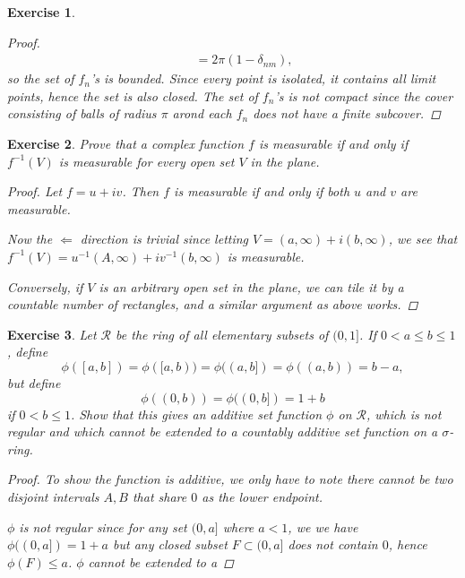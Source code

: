 \documentclass[10pt,letterpaper]{amsart}
\newtheorem{exercise}{Exercise}[section]
\theoremstyle{definition}
\theoremstyle{remark}
\numberwithin{equation}{exercise}
\begin{document}
\begin{multicols}{2}
\begin{exercise}
\begin{proof}
\begin{align*}
        &\quad= 2\pi (1-\delta_{nm}),
      \end{align*}
      so the set of $f_n$'s is bounded. Since every point is isolated, it
      contains all limit points, hence the set is also closed.
      The set of $f_n$'s is not compact since the cover consisting of balls
      of radius $\pi$ arond each $f_n$ does not have a finite subcover.
    \end{proof}
  \end{exercise}
  \begin{exercise}
    Prove that a complex function $f$ is measurable if and only if $f^{-1}(V)$ is
    measurable for every open set $V$ in the plane.
    \begin{proof}
      Let $f = u + iv$. Then $f$ is measurable if and only if both $u$ and $v$
      are measurable.
      \par Now the $\Leftarrow$ direction is trivial since letting $V =
      (a,\infty) + i(b,\infty)$, we see that $f^{-1}(V) = u^{-1}(A,\infty)
      + iv^{-1}(b,\infty)$ is measurable.
      \par Conversely, if $V$ is an arbitrary open set in the plane, we can tile
      it by a countable number of rectangles, and a similar argument as above
      works.
    \end{proof}
  \end{exercise}
  \begin{exercise}
    Let $\mathscr{R}$ be the ring of all elementary subsets of $(0,1]$. If $0 <
    a \le b \le 1$, define
    \begin{equation*}
      \phi([a,b]) = \phi([a,b)) = \phi((a,b]) = \phi((a,b)) = b-a,
    \end{equation*}
    but define
    \begin{equation*}
      \phi((0,b)) = \phi((0,b]) = 1 + b
    \end{equation*}
    if $0 < b \le 1$. Show that this gives an additive set function $\phi$ on
    $\mathscr{R}$, which is not regular and which cannot be extended to a
    countably additive set function on a $\sigma$-ring.
    \begin{proof}
      To show the function is additive, we only have to note there cannot be two
      disjoint intervals $A,B$ that share $0$ as the lower endpoint.
      \par $\phi$ is not regular since for any set $(0,a]$ where $a < 1$, we
      we have $\phi((0,a]) = 1+a$ but any closed subset $F \subset (0,a]$ does not
      contain $0$, hence $\phi(F) \le a$. $\phi$ cannot be extended to a

\end{proof}
\end{exercise}
\end{multicols}
\end{document}
